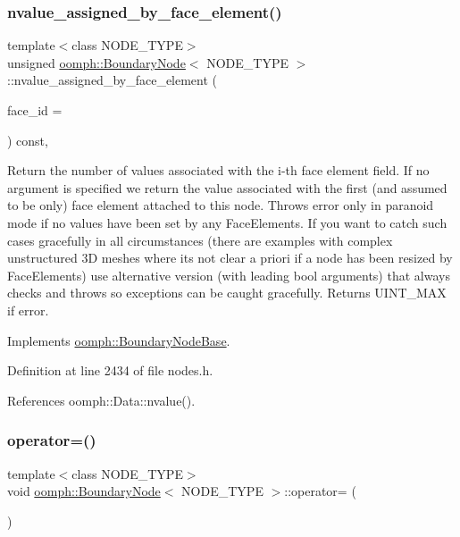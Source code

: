 \subsubsection{\texorpdfstring{nvalue\+\_\+assigned\+\_\+by\+\_\+face\+\_\+element()}{nvalue\_assigned\_by\_face\_element()}}
{\footnotesize\ttfamily template$<$class N\+O\+D\+E\+\_\+\+T\+Y\+PE$>$ \\
unsigned \hyperlink{classoomph_1_1BoundaryNode}{oomph\+::\+Boundary\+Node}$<$ N\+O\+D\+E\+\_\+\+T\+Y\+PE $>$\+::nvalue\+\_\+assigned\+\_\+by\+\_\+face\+\_\+element (\begin{DoxyParamCaption}\item[{const unsigned \&}]{face\+\_\+id = {} }\end{DoxyParamCaption}) const\hspace{0.3cm}{\ttfamily [inline]}, {\ttfamily [virtual]}}



Return the number of values associated with the i-\/th face element field. If no argument is specified we return the value associated with the first (and assumed to be only) face element attached to this node. Throws error only in paranoid mode if no values have been set by any Face\+Elements. If you want to catch such cases gracefully in all circumstances (there are examples with complex unstructured 3D meshes where it\textquotesingle{}s not clear a priori if a node has been resized by Face\+Elements) use alternative version (with leading bool arguments) that always checks and throws so exceptions can be caught gracefully. Returns U\+I\+N\+T\+\_\+\+M\+AX if error. 



Implements \hyperlink{classoomph_1_1BoundaryNodeBase_ae0d9f15e311861a09073ee01e5fb5cd2}{oomph\+::\+Boundary\+Node\+Base}.



Definition at line 2434 of file nodes.\+h.



References oomph\+::\+Data\+::nvalue().

\mbox{\label{classoomph_1_1BoundaryNode_afe5cfe47e6b469f30da29e9921c0f39d}} 
\subsubsection{\texorpdfstring{operator=()}{operator=()}}
{\footnotesize\ttfamily template$<$class N\+O\+D\+E\+\_\+\+T\+Y\+PE$>$ \\
void \hyperlink{classoomph_1_1BoundaryNode}{oomph\+::\+Boundary\+Node}$<$ N\+O\+D\+E\+\_\+\+T\+Y\+PE $>$\+::operator= (\begin{DoxyParamCaption}\item[{const \hyperlink{classoomph_1_1BoundaryNode}{Boundary\+Node}$<$ N\+O\+D\+E\+\_\+\+T\+Y\+PE $>$ \&}]{ }\end{DoxyParamCaption})\hspace{0.3cm}{\ttfamily [inline]}}



